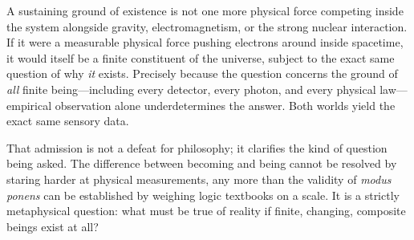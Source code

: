 A sustaining ground of existence is not one more physical force competing inside the system alongside gravity, electromagnetism, or the strong nuclear interaction. If it were a measurable physical force pushing electrons around inside spacetime, it would itself be a finite constituent of the universe, subject to the exact same question of why \emph{it} exists. Precisely because the question concerns the ground of \emph{all} finite being---including every detector, every photon, and every physical law---empirical observation alone underdetermines the answer. Both worlds yield the exact same sensory data.

That admission is not a defeat for philosophy; it clarifies the kind of question being asked. The difference between becoming and being cannot be resolved by staring harder at physical measurements, any more than the validity of \emph{modus ponens} can be established by weighing logic textbooks on a scale. It is a strictly metaphysical question: what must be true of reality if finite, changing, composite beings exist at all?
